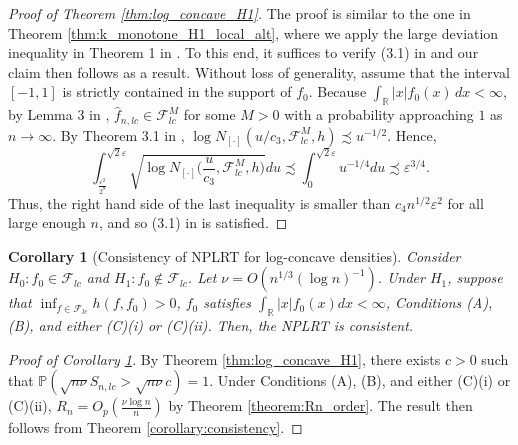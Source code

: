\documentclass[12pt,letterpaper, twoside, openany]{article}
\theoremstyle{plain}
\newtheorem{corollary}[theorem]{Corollary}
\begin{document}
\begin{proof}[Proof of Theorem \ref{thm:log_concave_H1}]
The proof is similar to the one in Theorem \ref{thm:k_monotone_H1_local_alt}, where we apply the large deviation inequality in Theorem 1 in \cite{wong1995probability}. To this end, it suffices to verify (3.1) in \cite{wong1995probability} and our claim then follows as a result. 
Without loss of generality, assume that the interval $[-1,1]$ is strictly contained in the support of $f_0$. 
Because $\int_{\mathbb{R}} |x|f_0(x)\, dx < \infty$, by Lemma 3 in \cite{cule2010MLE_log_concave}, $\hat{f}_{n,lc} \in \mathcal{F}^M_{lc}$ for some $M > 0$ with a probability approaching $1$ as $n \rightarrow \infty$.  By Theorem 3.1 in \cite{doss2016global}, $\log N_{[\cdot]}(u/c_3, \mathcal{F}^M_{lc}, h) \precsim u^{-1/2}$. Hence,
\begin{equation*}
\int^{\sqrt{2}\varepsilon}_{\frac{\varepsilon^2}{2^8}} \sqrt{ \log N_{[\cdot]} \bigg( \frac{u}{c_3}, \mathcal{F}^M_{lc}, h \bigg)} du \precsim \int^{\sqrt{2}{\varepsilon}}_0 u^{-1/4} du \precsim \varepsilon^{3/4}.
\end{equation*}
Thus, the right hand side of the last inequality is smaller than $c_4 n^{1/2} \varepsilon^2$ for all large enough $n$, and so (3.1) in \cite{wong1995probability} is satisfied.
\end{proof}


		\begin{corollary}[Consistency of NPLRT for log-concave densities]\label{cor:log_convcave_consistency}
			Consider $H_0: f_0 \in \mathcal{F}_{lc}$ and $H_1: f_0 \notin \mathcal{F}_{lc}$. 
 Let $\nu = O(n^{1/3}(\log n)^{-1})$. Under $H_1$, suppose that  $\inf_{f \in \mathcal{F}_{lc}}h(f, f_0) > 0$, $f_0$ satisfies    $\int_{\mathbb{R}} |x| f_0(x)dx < \infty$, Conditions (A), (B), and either (C)(i) or (C)(ii). Then, the NPLRT is consistent.
			
		
		\end{corollary}


\begin{proof}[Proof of Corollary \ref{cor:log_convcave_consistency}]
By Theorem \ref{thm:log_concave_H1}, there exists $c> 0$ such that $\mathbb{P}(\sqrt{n\nu} S_{n,lc} > \sqrt{n \nu} c) = 1$. Under Conditions (A), (B), and either (C)(i) or (C)(ii), $R_n = O_p( \frac{\nu \log n}{n})$ by Theorem \ref{theorem:Rn_order}. The result then follows from Theorem \ref{corollary:consistency}.

\end{proof}
\end{document}
